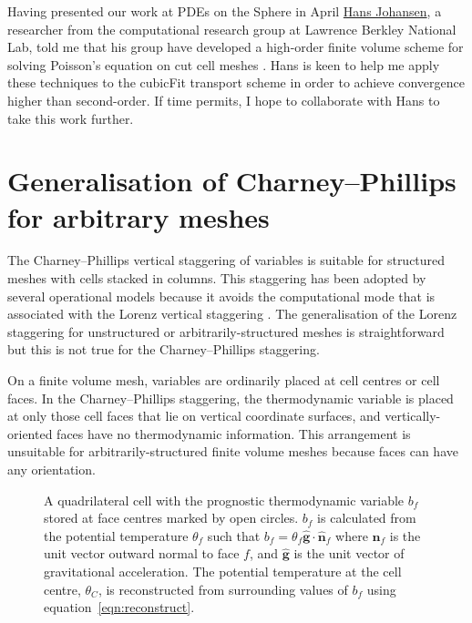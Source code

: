 \documentclass[a4paper,11pt]{article}
\begin{document}
Having presented our work at PDEs on the Sphere in April \href{http://crd.lbl.gov/departments/applied-mathematics/ANAG/about/staff-and-postdocs/hans-johansen/}{Hans Johansen}, a researcher from the computational research group at Lawrence Berkley National Lab, told me that his group have developed a high-order finite volume scheme for solving Poisson's equation on cut cell meshes \citep{devendran2015}.  Hans is keen to help me apply these techniques to the cubicFit transport scheme in order to achieve convergence higher than second-order.  If time permits, I hope to collaborate with Hans to take this work further.

\section{Generalisation of Charney--Phillips for arbitrary meshes}

The Charney--Phillips vertical staggering of variables \citep{charney-phillips1953} is suitable for structured meshes with cells stacked in columns. This staggering has been adopted by several operational models \citep{davies2005,yang2007,girard2014} because it avoids the computational mode that is associated with the Lorenz vertical staggering \citep{arakawa-konor1996}. The generalisation of the Lorenz staggering for unstructured or arbitrarily-structured meshes is straightforward \citep{weller-shahrokhi2014} but this is not true for the Charney--Phillips staggering.

On a finite volume mesh, variables are ordinarily placed at cell centres or cell faces. In the Charney--Phillips staggering, the thermodynamic variable is placed at only those cell faces that lie on vertical coordinate surfaces, and vertically-oriented faces have no thermodynamic information. This arrangement is unsuitable for arbitrarily-structured finite volume meshes because faces can have any orientation.

\begin{figure}
\centering

	\caption{A quadrilateral cell with the prognostic thermodynamic variable $b_f$ stored at face centres marked by open circles.  $b_f$ is calculated from the potential temperature $\theta_f$ such that $b_f = \theta_f \mathbf{\hat{g}} \cdot \mathbf{\hat{n}}_f$ where $\mathbf{\hat{n}}_f$ is the unit vector outward normal to face $f$, and $\mathbf{\hat{g}}$ is the unit vector of gravitational acceleration.  The potential temperature at the cell centre, $\theta_C$, is reconstructed from surrounding values of $b_f$ using equation~\eqref{eqn:reconstruct}.}
\label{fig:cp-staggering}
\end{figure}
\end{document}
